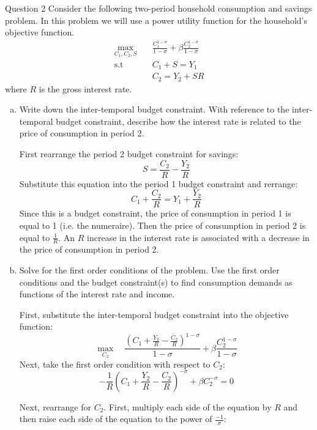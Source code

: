 \documentclass[a4paper]{article}
\newif\IfInSansMode
\begin{document}
	\begin{questionbox}{Question 2}
		Consider the following two-period household consumption and savings problem. In this problem we will use a power utility function for the household's objective function.
		\begin{align*}
			\max_{C_1,C_2,S} \quad &\frac{C_1^{1-\sigma}}{1 - \sigma} + \beta\frac{C_2^{1-\sigma}}{1-\sigma}\\
			\text{s.t} \quad &C_1 + S = Y_1\\
			&C_2 = Y_2 + SR
		\end{align*}
		where \( R \) is the gross interest rate.
		\begin{enumerate}[(a)]
			\item Write down the inter-temporal budget constraint. With reference to the inter-temporal budget constraint, describe how the interest rate is related to the price of consumption in period 2.
			\begin{explanationbox}
				First rearrange the period 2 budget constraint for savings:
				\[
					S = \frac{C_2}{R}-\frac{Y_2}{R}
				\]
				Substitute this equation into the period 1 budget constraint and rerrange:
				\[
					C_1 + \frac{C_2}{R} = Y_1 + \frac{Y_2}{R}
				\]
				Since this is a budget constraint, the price of consumption in period 1 is equal to 1 (i.e. the numeraire). Then the price of consumption in period 2 is equal to \( \frac{1}{R} \). An \( R \) increase in the interest rate is associated with a decrease in the price of consumption in period 2.
			\end{explanationbox}
			\item Solve for the first order conditions of the problem. Use the first order conditions and the budget constraint(s) to find consumption demands as functions of the interest rate and income.
			\begin{explanationbox}
				First, substitute the inter-temporal budget constraint into the objective function:
				\[
					\max_{C_2} \quad \frac{(C_1+\frac{Y_2}{R}-\frac{C_2}{R})^{1-\sigma}}{1 - \sigma} + \beta\frac{C_2^{1-\sigma}}{1-\sigma}
				\]
				Next, take the first order condition with respect to \( C_2 \):
				\[
					-\frac{1}{R}\left( C_1+\frac{Y_2}{R}-\frac{C_2}{R} \right)^{-\sigma} + \beta C_2^{-\sigma} = 0
				\]
			\end{explanationbox}
			\begin{explanationbox}
				Next, rearrange for \( C_2 \). First, multiply each side of the equation by \( R \) and then raise each side of the equation to the power of \( \frac{-1}{\sigma} \):

\end{explanationbox}
\end{enumerate}
\end{questionbox}
\end{document}
